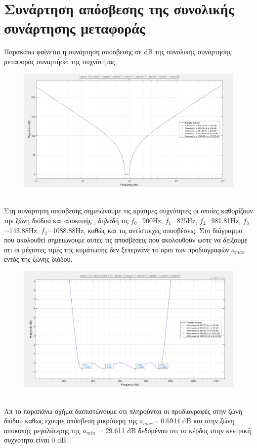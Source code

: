 \documentclass{article}
\begin{document}
{{\section*{Συνάρτηση απόσβεσης της συνολικής συνάρτησης μεταφοράς} 
Παρακάτω φαίνεται η συνάρτηση απόσβεσης σε dB της συνολικής συνάρτησης μεταφοράς συναρτήσει της συχνότητας. 
\begin{figure}[h!]
\centering
 	\advance\leftskip-4.1cm
  \includegraphics[width=205mm,scale=2]{thema2/matlab6.jpg}
\end{figure}  
\\
    \color{black} Στη συνάρτηση  απόσβεσης σημειώνουμε τις κρίσιμες συχνότητες οι οποίες καθορίζουν την ζώνη διόδου και αποκοπής , δηλαδή τις $f_0$=900Ηz, $f_1$=825Hz, $f_2$=981.81Hz, $f_3$=743.88Hz, $f_4$=1088.88Hz, καθώς και τις αντίστοιχες αποσβέσεις.
\clearpage
Στο διάγραμμα που ακολουθεί σημειώνουμε αυτες τις αποσβέσεις που ακολουθούν ωστε να δείξουμε οτι οι μέγιστες τιμές της κυμάτωσης δεν ξεπερνάνε το οριο των προδιαγραφών $a_{max}$ εντός της ζώνης διόδου.
\begin{figure}[h!]
\centering
 	\advance\leftskip-1.8cm
  \includegraphics[width=170mm,scale=2]{thema2/matlab6a.jpg}
\end{figure}\\
 Aπ το παραπάνω σχήμα διαπιστώνουμε οτι πληρούνται οι προδιαγραφές στην ζώνη διόδου καθως εχουμε απόσβεση μικρότερη της $a_{max}$= 0.6944 dB  και στην ζώνη αποκοπής μεγαλύτερης της $a_{min}$ = 29.611 dB δεδομένου οτι το κέρδος στην κεντρική συχνότητα είναι 0 dB.\\
\clearpage

}}
\end{document}

